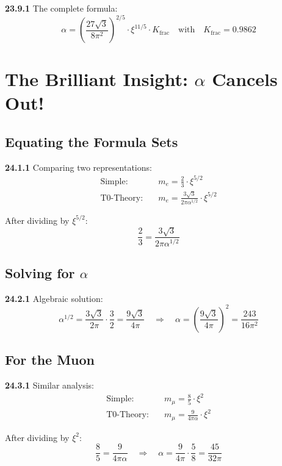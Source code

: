 \noindent \textbf{23.9.1} The complete formula:
\[
\boxed{
	\alpha = \left(\frac{27\sqrt{3}}{8\pi^2}\right)^{2/5} \cdot \xi^{11/5} \cdot K_{\text{frac}}
}
\quad \text{with} \quad K_{\text{frac}} = 0.9862
\]	


\section{The Brilliant Insight: $\alpha$ Cancels Out!}

\subsection{Equating the Formula Sets}

\noindent \textbf{24.1.1} Comparing two representations:
\begin{align*}
	\text{Simple:} &\quad m_e = \frac{2}{3} \cdot \xi^{5/2} \\
	\text{T0-Theory:} &\quad m_e = \frac{3\sqrt{3}}{2\pi\alpha^{1/2}} \cdot \xi^{5/2}
\end{align*}

After dividing by $\xi^{5/2}$:
\[
\frac{2}{3} = \frac{3\sqrt{3}}{2\pi\alpha^{1/2}}
\]

\subsection{Solving for $\alpha$}

\noindent \textbf{24.2.1} Algebraic solution:
\[
\alpha^{1/2} = \frac{3\sqrt{3}}{2\pi} \cdot \frac{3}{2} = \frac{9\sqrt{3}}{4\pi}
\quad \Rightarrow \quad
\alpha = \left(\frac{9\sqrt{3}}{4\pi}\right)^2 = \frac{243}{16\pi^2}
\]

\subsection{For the Muon}

\noindent \textbf{24.3.1} Similar analysis:
\begin{align*}
	\text{Simple:} &\quad m_\mu = \frac{8}{5} \cdot \xi^2 \\
	\text{T0-Theory:} &\quad m_\mu = \frac{9}{4\pi\alpha} \cdot \xi^2
\end{align*}

After dividing by $\xi^2$:
\[
\frac{8}{5} = \frac{9}{4\pi\alpha}
\quad \Rightarrow \quad
\alpha = \frac{9}{4\pi} \cdot \frac{5}{8} = \frac{45}{32\pi}
\]

